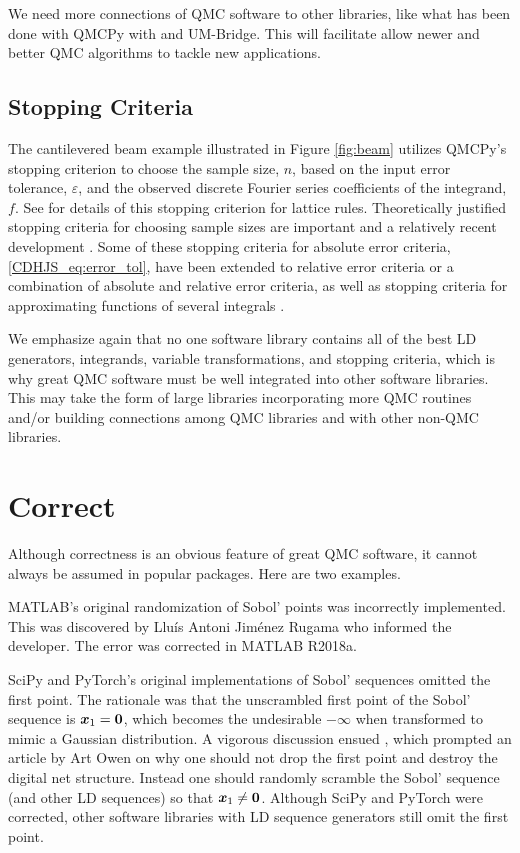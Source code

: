 \documentclass[graybox]{svmult}
\begin{document}
We need more connections of QMC software to other libraries, like what has been done with  QMCPy with and UM-Bridge.  This will facilitate allow newer and better QMC algorithms to tackle new applications.

\subsection{Stopping Criteria}
The cantilevered beam example illustrated in Figure \ref{fig:beam} utilizes QMCPy's stopping criterion to choose the sample size, $n$, based on the input error tolerance, $\varepsilon$, and the observed discrete Fourier series coefficients of the integrand, $f$.  See \cite{HicJim16a} for details of this stopping criterion for lattice rules.  Theoretically justified stopping criteria for choosing sample sizes are important and a relatively recent development \cite{HicEtal14a,HicJim16a,JimHic16a,RatHic19a,JagHic22a}.  Some of these stopping criteria for absolute error criteria, \eqref{CDHJS_eq:error_tol},  have been extended to relative error criteria or a combination of absolute and relative error criteria, as well as stopping criteria for approximating functions of several integrals \cite{Jia16a,GilJim16b,HicEtal17a,JagSor23a}.

We emphasize again that no one software library contains all of the best LD generators, integrands, variable transformations, and stopping criteria, which is why great QMC software must be well integrated into other software libraries.  This may take the form of large libraries incorporating more QMC routines and/or building connections among QMC libraries and with other non-QMC libraries.


\section{Correct} \label{CDHJS_sec:correct}
Although correctness is an obvious feature of great QMC software, it cannot always be assumed in popular packages.  Here are two examples.

MATLAB's original randomization of Sobol' points was incorrectly implemented.  This was discovered by Llu\'is Antoni Jim\'enez Rugama who informed the developer.  The error was corrected in MATLAB R2018a.

SciPy and PyTorch's original implementations of Sobol' sequences omitted the first point.  The rationale was that the unscrambled first point of the Sobol' sequence is ${\boldsymbol{x}}_1 = {\boldsymbol{0}}$, which becomes the undesirable $\boldsymbol{-\infty}$ when transformed to mimic a Gaussian distribution.  A vigorous discussion ensued \cite{scipySobol2020a}, which prompted an article by Art Owen \cite{Owe22a} on why one should not drop the first point and destroy the digital net structure.  Instead one should randomly scramble the Sobol' sequence (and other LD sequences) so that ${\boldsymbol{x}}_1 \ne {\boldsymbol{0}}$.  Although SciPy and PyTorch were corrected, other software libraries with LD sequence generators still omit the first point.
\end{document}

